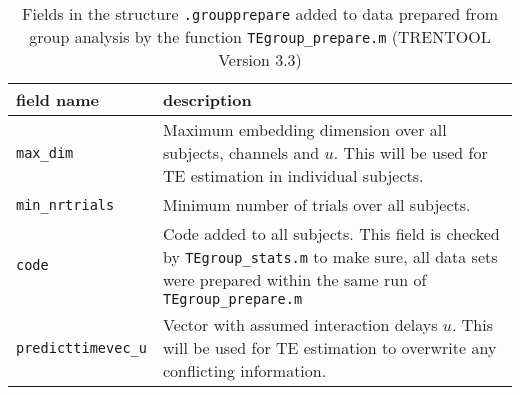\begin{table}[H]
\small
\caption[Results \texttt{.groupprepare}]{Fields in the structure \texttt{.groupprepare} added to data prepared from group analysis by the function \texttt{TEgroup\_prepare.m} (TRENTOOL Version 3.3)} 
\begin{tabularx}{\textwidth}{lX} \toprule
\textbf{field name} & \textbf{description} \\ \midrule
\verb+max_dim+ & Maximum embedding dimension over all subjects, channels and $u$. This will be used for TE estimation in individual subjects.\\
\rowcolor{Gray}
\verb+min_nrtrials+ & Minimum number of trials over all subjects.\\
\verb+code+ & Code added to all subjects. This field is checked by \verb+TEgroup_stats.m+ to make sure, all data sets were prepared within the same run of \verb+TEgroup_prepare.m+\\
\rowcolor{Gray}
\verb+predicttimevec_u+ & Vector with assumed interaction delays  $u$. This will be used for TE estimation to overwrite any conflicting information. \\
\bottomrule
\end{tabularx} \label{tab:groupprepare}
\end{table}